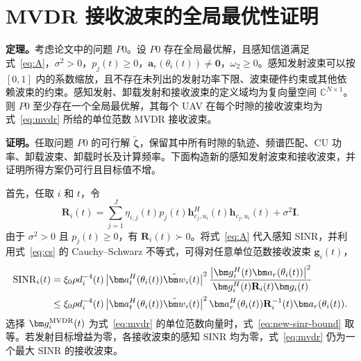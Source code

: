 \section{MVDR 接收波束的全局最优性证明}

\noindent\textbf{定理。}考虑论文中的问题 $P0$。设 $P0$ 存在全局最优解，且感知信道满足式~\eqref{eq:A}，$\sigma^2>0$，$p_j(t)\ge 0$，$\bm a_r(\theta_i(t))\ne\bm 0$，$\omega_2\ge 0$。感知发射波束可以按 $[0,1]$ 内的系数缩放，且不存在未列出的发射功率下限、波束硬件约束或其他依赖波束的约束。感知发射、卸载发射和接收波束的定义域均为复向量空间 $\mathbb C^{N\times1}$。
则 $P0$ 至少存在一个全局最优解，其每个 UAV 在每个时隙的接收波束均为式~\eqref{eq:mvdr} 所给的单位范数 MVDR 接收波束。

\medskip
\noindent\textbf{证明。}任取问题 $P0$ 的可行解 $\tilde{\bm\zeta}$，保留其中所有时隙的轨迹、频谱匹配、CU 功率、卸载波束、卸载时长及计算频率。下面构造新的感知发射波束和接收波束，并证明所得方案仍可行且目标值不增。

首先，任取 $i$ 和 $t$，令
\begin{equation}\label{eq:new-cov}
\mathbf R_i(t)=\sum_{j=1}^{J}\eta_{i,j}(t)p_j(t)
\bm h_{c_j,u_i}^{H}(t)\bm h_{c_j,u_i}(t)+\sigma^2\mathbf I.
\end{equation}
由于 $\sigma^2>0$ 且 $p_j(t)\ge0$，有 $\mathbf R_i(t)\succ0$。将式~\eqref{eq:A} 代入感知 SINR，并利用式~\eqref{eq:cs} 的 Cauchy--Schwarz 不等式，可得对任意单位范数接收波束 $\bm g_i(t)$，
\begin{align}\label{eq:new-sinr-bound}
\operatorname{SINR}_i(t)
&=\xi_0\rho d_i^{-4}(t)\left|\bm a_t^H(\theta_i(t))\tilde{\bm w}_i(t)\right|^2
\frac{\left|\bm g_i^H(t)\bm a_r(\theta_i(t))\right|^2}
{\bm g_i^H(t)\mathbf R_i(t)\bm g_i(t)}\notag\\
&\le\xi_0\rho d_i^{-4}(t)\left|\bm a_t^H(\theta_i(t))\tilde{\bm w}_i(t)\right|^2
\bm a_r^H(\theta_i(t))\mathbf R_i^{-1}(t)\bm a_r(\theta_i(t)).
\end{align}
选择 $\bm g_i^{\rm MVDR}(t)$ 为式~\eqref{eq:mvdr} 的单位范数向量时，式~\eqref{eq:new-sinr-bound} 取等。若发射目标增益为零，各接收波束的感知 SINR 均为零，式~\eqref{eq:mvdr} 仍为一个最大 SINR 的接收波束。

